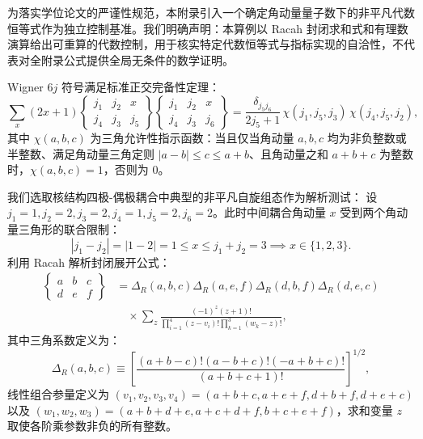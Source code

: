 为落实学位论文的严谨性规范，本附录引入一个确定角动量量子数下的非平凡代数恒等式作为独立控制基准。我们明确声明：本算例以 Racah 封闭求和式和有理数演算给出可重算的代数控制，用于核实特定代数恒等式与指标实现的自洽性，不代表对全附录公式提供全局无条件的数学证明。

Wigner $6j$ 符号满足标准正交完备性定理：
\begin{equation}\label{eq:appA-6j-ortho-theorem}
\sum_x (2x + 1) \begin{Bmatrix} j_1 & j_2 & x \\ j_4 & j_3 & j_5 \end{Bmatrix} \begin{Bmatrix} j_1 & j_2 & x \\ j_4 & j_3 & j_6 \end{Bmatrix} = \frac{\delta_{j_5 j_6}}{2j_5 + 1} \, \chi(j_1, j_5, j_3) \, \chi(j_4, j_5, j_2) ,
\end{equation}
其中 $\chi(a, b, c)$ 为三角允许性指示函数：当且仅当角动量 $a, b, c$ 均为非负整数或半整数、满足角动量三角定则 $|a - b| \le c \le a + b$、且角动量之和 $a + b + c$ 为整数时，$\chi(a, b, c) = 1$，否则为 0。

我们选取核结构四极-偶极耦合中典型的非平凡自旋组态作为解析测试：
设 $j_1 = 1, j_2 = 2, j_3 = 2, j_4 = 1, j_5 = 2, j_6 = 2$。此时中间耦合角动量 $x$ 受到两个角动量三角形的联合限制：
\begin{equation}
|j_1 - j_2| = |1 - 2| = 1 \le x \le j_1 + j_2 = 3 \implies x \in \{1, 2, 3\} .
\end{equation}
利用 Racah 解析封闭展开公式：
\begin{equation}\label{eq:appA-racah-formula}
\begin{aligned}
\begin{Bmatrix} a & b & c \\ d & e & f \end{Bmatrix} &= \Delta_R(a,b,c) \Delta_R(a,e,f) \Delta_R(d,b,f) \Delta_R(d,e,c) \\
&\quad \times \sum_z \frac{(-1)^z (z+1)!}{\prod_{i=1}^4 (z - v_i)! \prod_{k=1}^3 (w_k - z)!} ,
\end{aligned}
\end{equation}
其中三角系数定义为：
\begin{equation}\label{eq:appA-delta-r-def}
\Delta_R(a,b,c) \equiv \left[ \frac{(a+b-c)!(a-b+c)!(-a+b+c)!}{(a+b+c+1)!} \right]^{1/2} ,
\end{equation}
线性组合参量定义为 $(v_1, v_2, v_3, v_4) = (a+b+c, a+e+f, d+b+f, d+e+c)$ 以及 $(w_1, w_2, w_3) = (a+b+d+e, a+c+d+f, b+c+e+f)$，求和变量 $z$ 取使各阶乘参数非负的所有整数。

